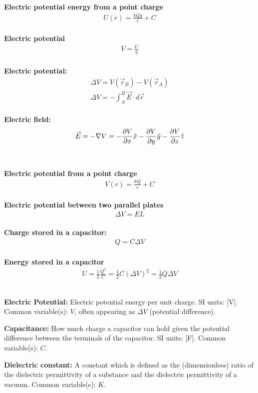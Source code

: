 \newpage
\begin{importantEquations}
\medskip
\begin{multicols}{2}
\textbf{Electric potential energy from a point charge}
\begin{align*}
U(r)=\frac{kQq}{r}+C
\end{align*}
\\
\textbf{Electric potential}
\begin{align*}
V=\frac{U}{q}
\end{align*}
\\
\textbf{Electric potential:}
\begin{align*}
\Delta V = V(\vec r_B)-V(\vec r_A)\\
\Delta V = -\int_{A}^{B}\vec E \cdot d\vec r
\end{align*}
\\
\textbf{Electric field:}
\begin{align*}
\vec E=-\nabla V =-\frac{\partial V}{\partial x}\hat x-\frac{\partial V}{\partial y}\hat y-\frac{\partial V}{\partial z}\hat z
\end{align*}
\\
\columnbreak
\\
\textbf{Electric potential from a point charge}
\begin{align*}
V(r)=\frac{kQ}{r}+C
\end{align*}
\\
\textbf{Electric potential between two parallel plates}
\begin{align*}
\Delta V = EL
\end{align*}
\\
\textbf{Charge stored in a capacitor:}
\begin{align*}
Q = C\Delta V
\end{align*}
\\
\textbf{Energy stored in a capacitor}
\begin{align*}
U = \frac{1}{2}\frac{Q^2}{C} = \frac{1}{2}C(\Delta V)^2=\frac{1}{2}Q\Delta V
\end{align*}
\\
\end{multicols}
\end{importantEquations}

\begin{definitions}
	\textbf{Electric Potential:} Electric potential energy per unit charge. SI units: [\si{V}]. Common variable(s): $V$, often appearing as $\Delta V$ (potential difference).
	\item \textbf{Capacitance:} How much charge a capacitor can hold given the potential difference between the terminals of the capacitor. SI units: [\si{F}]. Common variable(s): $C$.
	\item \textbf{Dielectric constant:} A constant which is defined as the (dimensionless) ratio of the dielectric permittivity of a substance and the dielectric permittivity of a vacuum. Common variable(s): $K$.
\end{definitions}

